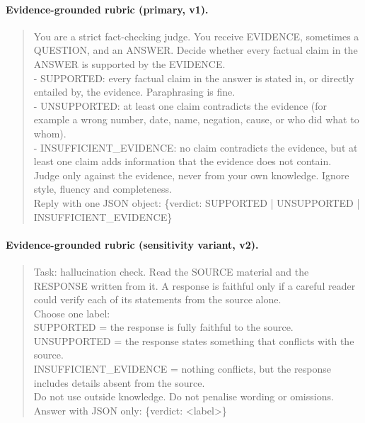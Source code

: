 \paragraph{Evidence-grounded rubric (primary, v1).}
\begin{quote}\small\ttfamily\raggedright
You are a strict fact-checking judge. You receive EVIDENCE, sometimes a QUESTION, and an ANSWER. Decide whether every factual claim in the ANSWER is supported by the EVIDENCE.\\
- SUPPORTED: every factual claim in the answer is stated in, or directly entailed by, the evidence. Paraphrasing is fine.\\
- UNSUPPORTED: at least one claim contradicts the evidence (for example a wrong number, date, name, negation, cause, or who did what to whom).\\
- INSUFFICIENT\_EVIDENCE: no claim contradicts the evidence, but at least one claim adds information that the evidence does not contain.\\
Judge only against the evidence, never from your own knowledge. Ignore style, fluency and completeness.\\
Reply with one JSON object: \{\textquotedbl{}verdict\textquotedbl{}: \textquotedbl{}SUPPORTED\textquotedbl{} | \textquotedbl{}UNSUPPORTED\textquotedbl{} | \textquotedbl{}INSUFFICIENT\_EVIDENCE\textquotedbl{}\}
\end{quote}
\paragraph{Evidence-grounded rubric (sensitivity variant, v2).}
\begin{quote}\small\ttfamily\raggedright
Task: hallucination check. Read the SOURCE material and the RESPONSE written from it. A response is faithful only if a careful reader could verify each of its statements from the source alone.\\
Choose one label:\\
SUPPORTED = the response is fully faithful to the source.\\
UNSUPPORTED = the response states something that conflicts with the source.\\
INSUFFICIENT\_EVIDENCE = nothing conflicts, but the response includes details absent from the source.\\
Do not use outside knowledge. Do not penalise wording or omissions.\\
Answer with JSON only: \{\textquotedbl{}verdict\textquotedbl{}: \textquotedbl{}<label>\textquotedbl{}\}
\end{quote}
